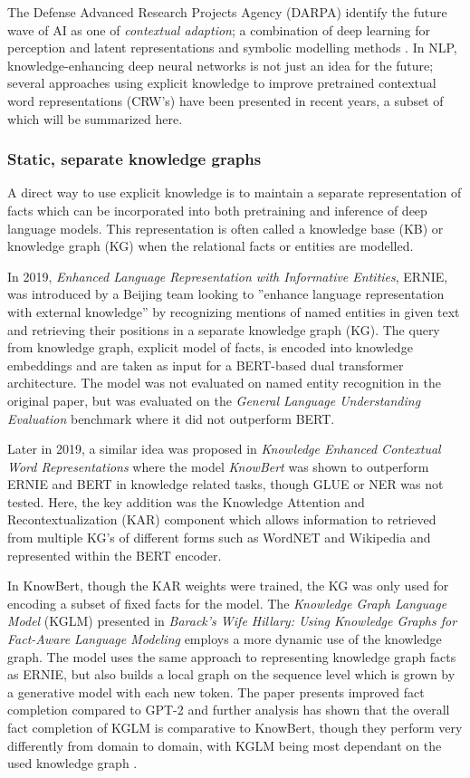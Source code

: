 \documentclass[main.tex]{subfiles}
\begin{document}
The Defense Advanced Research Projects Agency (DARPA) identify the future wave of AI as one of \emph{contextual adaption}; a combination of deep learning for perception and latent representations and symbolic modelling methods \cite{darpa17ai}.
In NLP, knowledge-enhancing deep neural networks is not just an idea for the future; several approaches using explicit knowledge to improve pretrained contextual word representations (CRW's) have been presented in recent years, a subset of which will be summarized here.

\subsubsection{Static, separate knowledge graphs}
A direct way to use explicit knowledge is to maintain a separate representation of facts which can be incorporated into both pretraining and inference of deep language models.
This representation is often called a knowledge base (KB) or knowledge graph (KG) when the relational facts or entities are modelled.

In 2019, \emph{Enhanced Language Representation with Informative Entities}, ERNIE, was introduced by a Beijing team \cite{zhang2019ernie} looking to ''enhance language representation  with  external  knowledge'' \cite[1]{zhang2019ernie} by recognizing mentions of named entities in given text and retrieving their positions in a separate knowledge graph (KG).
The query from knowledge graph, explicit model of facts, is encoded into knowledge embeddings and are taken as input for a BERT-based dual transformer architecture.
The model was not evaluated on named entity recognition in the original paper, but was evaluated on the \emph{General Language Understanding Evaluation} benchmark \cite{wang2018glue} where it did not outperform BERT.

Later in 2019, a similar idea was proposed in \emph{Knowledge Enhanced Contextual Word Representations} where the model \emph{KnowBert} \cite{peters2019knowbert} was shown to outperform ERNIE and BERT in knowledge related tasks, though GLUE or NER was not tested.
Here, the key addition was the Knowledge Attention and Recontextualization (KAR) component which allows information to retrieved from multiple KG's of different forms such as WordNET and Wikipedia and represented within the BERT encoder.

In KnowBert, though the KAR weights were trained, the KG was only used for encoding a subset of fixed facts for the model.
The \emph{Knowledge Graph Language Model} (KGLM) presented in \emph{Barack’s Wife Hillary: Using Knowledge Graphs for Fact-Aware Language Modeling} \cite{logan2019barack} employs a more dynamic use of the knowledge graph.
The model uses the same approach to representing knowledge graph facts as ERNIE, but also builds a local graph on the sequence level which is grown by a generative model with each new token.
The paper presents improved fact completion compared to GPT-2 and further analysis has shown that the overall fact completion of KGLM is comparative to KnowBert, though they perform very differently from domain to domain, with KGLM being most dependant on the used knowledge graph \cite{birk2020knowledge}.
\end{document}

